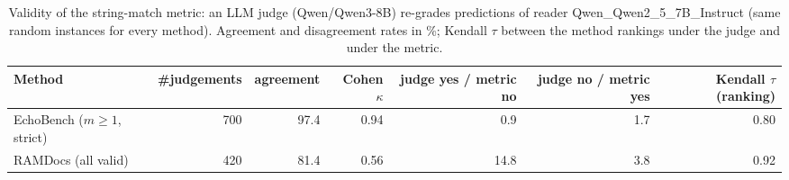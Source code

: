 \begin{table}[tbp]
\centering
\small
\caption{Validity of the string-match metric: an LLM judge (Qwen/Qwen3-8B) re-grades predictions of reader Qwen\_Qwen2\_5\_7B\_Instruct (same random instances for every method). Agreement and disagreement rates in \%; Kendall $\tau$ between the method rankings under the judge and under the metric.}
\label{tab:judge}
\setlength{\tabcolsep}{4pt}
\begin{tabular}{lrrrrrr}
\toprule
Method & \#judgements & agreement & Cohen $\kappa$ & judge yes / metric no & judge no / metric yes & Kendall $\tau$ (ranking) \\
\midrule
EchoBench ($m\geq1$, strict) & 700 & 97.4 & 0.94 & 0.9 & 1.7 & 0.80 \\
RAMDocs (all valid) & 420 & 81.4 & 0.56 & 14.8 & 3.8 & 0.92 \\
\bottomrule
\end{tabular}
\end{table}
